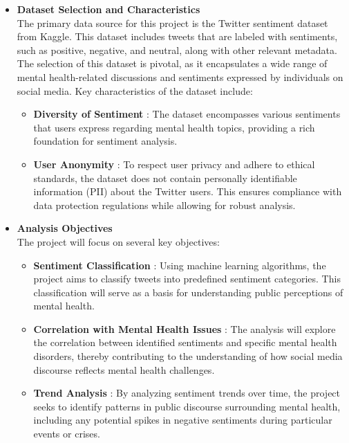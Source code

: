 \begin{itemize}
    \item \textbf{Dataset Selection and Characteristics} \\
    \noindent
    The primary data source for this project is the Twitter sentiment dataset from Kaggle. This dataset includes tweets that are labeled with sentiments, such as positive, negative, and neutral, along with other relevant metadata. The selection of this dataset is pivotal, as it encapsulates a wide range of mental health-related discussions and sentiments expressed by individuals on social media. Key characteristics of the dataset include:
    \begin{itemize}
        \item \textbf{Diversity of Sentiment} :
        \noindent
        The dataset encompasses various sentiments that users express regarding mental health topics, providing a rich foundation for sentiment analysis.
        \item \textbf{User Anonymity} :
        \noindent
        To respect user privacy and adhere to ethical standards, the dataset does not contain personally identifiable information (PII) about the Twitter users. This ensures compliance with data protection regulations while allowing for robust analysis.
    \end{itemize}

    \item \textbf{Analysis Objectives} \\
    \noindent
    The project will focus on several key objectives:
    \begin{itemize}
        \item \textbf{Sentiment Classification} :
        \noindent 
        Using machine learning algorithms, the project aims to classify tweets into predefined sentiment categories. This classification will serve as a basis for understanding public perceptions of mental health.
        \item \textbf{Correlation with Mental Health Issues} :
        \noindent
        The analysis will explore the correlation between identified sentiments and specific mental health disorders, thereby contributing to the understanding of how social media discourse reflects mental health challenges.
        \item \textbf{Trend Analysis} :
        \noindent
        By analyzing sentiment trends over time, the project seeks to identify patterns in public discourse surrounding mental health, including any potential spikes in negative sentiments during particular events or crises.
    \end{itemize}


\end{itemize}
